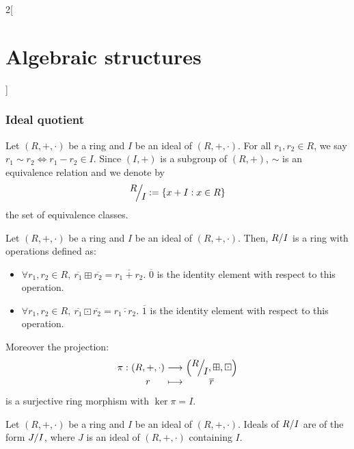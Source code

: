 \documentclass[../../../main_math.tex]{subfiles}
\begin{document}
\begin{multicols}{2}[\section{Algebraic structures}]
  \subsubsection{Ideal quotient}
  \begin{definition}
    Let $(R,+,\cdot)$ be a ring and $I$ be an ideal of $(R,+,\cdot)$. For all $r_1,r_2\in R$, we say $r_1\sim r_2\iff r_1-r_2\in I$. Since $(I,+)$ is a subgroup of $(R,+)$, $\sim$ is an equivalence relation and we denote by $$\quot{R}{I}:=\{x+I:x\in R\}$$ the set of equivalence classes.
  \end{definition}
  \begin{proposition}
    Let $(R,+,\cdot)$ be a ring and $I$ be an ideal of $(R,+,\cdot)$. Then, $\quot{R}{I}$ is a ring with operations defined as:
    \begin{itemize}
      \item $\forall r_1,r_2\in R,\ \overline{r_1}\boxplus\overline{r_2}=\overline{r_1+r_2}$. $\overline{0}$ is the identity element with respect to this operation.
      \item $\forall r_1,r_2\in R,\ \overline{r_1}\boxdot\overline{r_2}=\overline{r_1\cdot r_2}$. $\overline{1}$ is the identity element with respect to this operation.
    \end{itemize}
    Moreover the projection:
    $$\function{\pi}{(R,+,\cdot)}{\displaystyle\left(\quot{R}{I},\boxplus,\boxdot\right)}{r}{\overline{r}}$$
    is a surjective ring morphism with $\ker\pi=I$.
  \end{proposition}
  \begin{corollary}
    Let $(R,+,\cdot)$ be a ring and $I$ be an ideal of $(R,+,\cdot)$. Ideals of $\quot{R}{I}$ are of the form $\quot{J}{I}$, where $J$ is an ideal of $(R,+,\cdot)$ containing $I$.
  \end{corollary}

\end{multicols}
\end{document}

